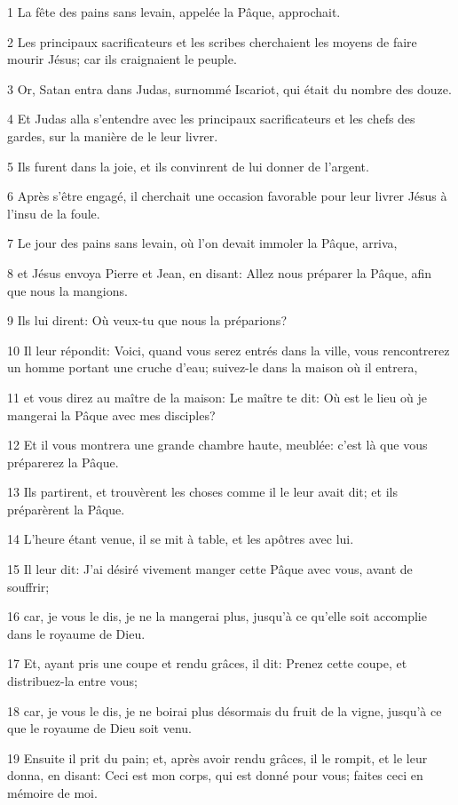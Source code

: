 \par 1 La fête des pains sans levain, appelée la Pâque, approchait.
\par 2 Les principaux sacrificateurs et les scribes cherchaient les moyens de faire mourir Jésus; car ils craignaient le peuple.
\par 3 Or, Satan entra dans Judas, surnommé Iscariot, qui était du nombre des douze.
\par 4 Et Judas alla s'entendre avec les principaux sacrificateurs et les chefs des gardes, sur la manière de le leur livrer.
\par 5 Ils furent dans la joie, et ils convinrent de lui donner de l'argent.
\par 6 Après s'être engagé, il cherchait une occasion favorable pour leur livrer Jésus à l'insu de la foule.
\par 7 Le jour des pains sans levain, où l'on devait immoler la Pâque, arriva,
\par 8 et Jésus envoya Pierre et Jean, en disant: Allez nous préparer la Pâque, afin que nous la mangions.
\par 9 Ils lui dirent: Où veux-tu que nous la préparions?
\par 10 Il leur répondit: Voici, quand vous serez entrés dans la ville, vous rencontrerez un homme portant une cruche d'eau; suivez-le dans la maison où il entrera,
\par 11 et vous direz au maître de la maison: Le maître te dit: Où est le lieu où je mangerai la Pâque avec mes disciples?
\par 12 Et il vous montrera une grande chambre haute, meublée: c'est là que vous préparerez la Pâque.
\par 13 Ils partirent, et trouvèrent les choses comme il le leur avait dit; et ils préparèrent la Pâque.
\par 14 L'heure étant venue, il se mit à table, et les apôtres avec lui.
\par 15 Il leur dit: J'ai désiré vivement manger cette Pâque avec vous, avant de souffrir;
\par 16 car, je vous le dis, je ne la mangerai plus, jusqu'à ce qu'elle soit accomplie dans le royaume de Dieu.
\par 17 Et, ayant pris une coupe et rendu grâces, il dit: Prenez cette coupe, et distribuez-la entre vous;
\par 18 car, je vous le dis, je ne boirai plus désormais du fruit de la vigne, jusqu'à ce que le royaume de Dieu soit venu.
\par 19 Ensuite il prit du pain; et, après avoir rendu grâces, il le rompit, et le leur donna, en disant: Ceci est mon corps, qui est donné pour vous; faites ceci en mémoire de moi.
